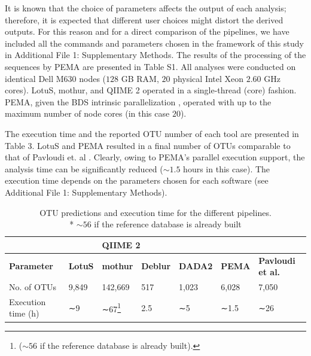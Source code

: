    It is known that the choice of parameters affects the output of each analysis; 
   therefore, it is expected that different user choices might distort the derived outputs. 
   For this reason and for a direct comparison of the pipelines, we have included all the commands and parameters chosen in the framework of this study in Additional File 1: Supplementary Methods. 
   The results of the processing of the sequences by PEMA are presented in Table S1. 
   All analyses were conducted on identical Dell M630 nodes ($128$ GB RAM, $20$ physical Intel Xeon $2.60$ GHz cores). 
   LotuS, mothur, and QIIME 2 operated in a single-thread (core) fashion. 
   PEMA, given the BDS intrinsic parallelization \citep{cingolani2015bigdatascript}, operated with up to the maximum number of node cores (in this case $20$).

   The execution time and the reported OTU number of each tool are presented in Table 3. 
   LotuS and PEMA resulted in a final number of OTUs comparable to that of Pavloudi et. al \citep{pavloudi2017sediment}. 
   Clearly, owing to PEMA's parallel execution support, the analysis time can be significantly reduced ($∼1.5$ hours in this case). 
   The execution time depends on the parameters chosen for each software (see Additional File 1: Supplementary Methods).


   \begin{table}[]
      \begin{tabular}{@{}lllllll@{}}
      \toprule
      \textbf{} & \textbf{} & \multicolumn{2}{l}{\textbf{QIIME 2}} & \textbf{} & \textbf{} &  \\ \midrule
      \textbf{Parameter} & \textbf{LotuS} & \textbf{mothur} & \textbf{Deblur} & \textbf{DADA2} & \textbf{PEMA} & \textbf{Pavloudi et al. \citep{pavloudi2017sediment}} \\
      No. of OTUs & 9,849 & 142,669 & 517 & 1,023 & 6,028 & 7,050 \\
      Execution time (h) & ∼9 & ∼67\footnote{($∼56$ if the reference database is already built).} & 2.5 & ∼5 & ∼1.5 & ∼26 \\ \bottomrule
      \end{tabular}
      \caption{OTU predictions and execution time for the different pipelines. \\ * $∼56$ if the reference database is already built}
   \end{table}

